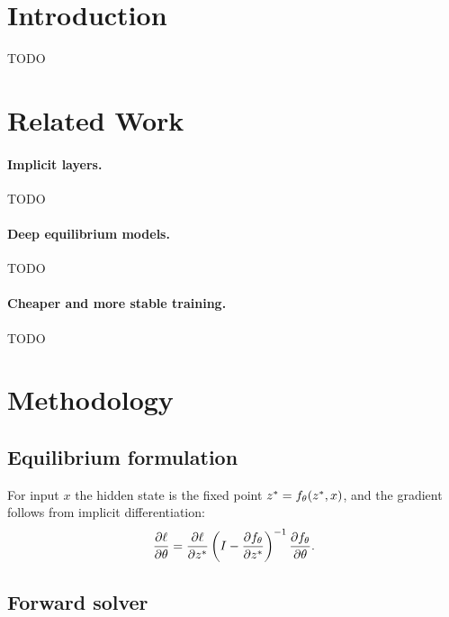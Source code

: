 \documentclass[11pt]{article}
\begin{document}
\makeheader

\section{Introduction}

\textsc{TODO}

\section{Related Work}

\paragraph{Implicit layers.}
\textsc{TODO}~\cite{amos2017optnet,chen2018neural,elghaoui2021implicit}

\paragraph{Deep equilibrium models.}
\textsc{TODO}~\cite{bai2019deq,bai2020mdeq,winston2020monotone}

\paragraph{Cheaper and more stable training.}
\textsc{TODO}~\cite{bai2021stabilizing,geng2021training,fung2022jfb}

\section{Methodology}

\subsection{Equilibrium formulation}

For input $x$ the hidden state is the fixed point
$z^{*} = f_{\theta}(z^{*}, x)$, and the gradient follows from implicit
differentiation:
\begin{equation}
  \frac{\partial \ell}{\partial \theta}
  = \frac{\partial \ell}{\partial z^{*}}\left(I - \frac{\partial f_{\theta}}{\partial z^{*}}\right)^{-1}\frac{\partial f_{\theta}}{\partial \theta}.
  \label{eq:implicit}
\end{equation}

\subsection{Forward solver}
\end{document}
